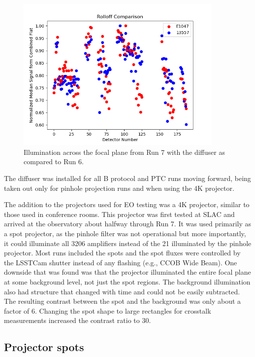 \begin{figure}[htbp]
\centering
\includegraphics[width=0.9\textwidth]{sections/figures/Run7_DiffuserIllumination.png}
\caption{Illumination across the focal plane from Run 7 with the diffuser as compared to Run 6.}
\label{fig:roll-off}
\end{figure}



The diffuser was installed for all B protocol and PTC runs moving
forward, being taken out only for pinhole projection runs and when using the
4K projector.

The addition to the projectors used for EO testing was a 4K
projector, similar to those used in conference rooms. This projector was
first tested at SLAC and arrived at the observatory about halfway through Run 7.
It was used primarily as a spot projector, as the pinhole filter
was not operational but more importantly, it could
illuminate all 3206 amplifiers instead of the 21 illuminated by the
pinhole projector. Most runs included the spots and the spot fluxes were
controlled by the LSSTCam shutter instead of any flashing (e.g., CCOB Wide Beam). One
downside that was found was that the projector illuminated the entire focal plane at some background level, not just the spot regions. The background illumination also had
structure that changed with time and could not be easily subtracted. The resulting contrast between the spot and the background was only about a factor of 6. Changing the spot shape to large rectangles for crosstalk
measurements increased the contrast ratio to 30.

\subsection{Projector spots}\label{projector-spots}

